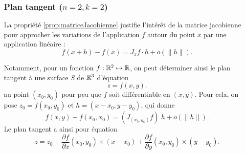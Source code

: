 
\subsubsection*{Plan tangent ($n = 2, k = 2$)}

La propriété \ref{prop:matriceJacobienne} justifie l'intérêt de la matrice jacobienne pour approcher les variations de l'application $f$ autour du point $x$ par une application linéaire : 
$$
f(x+h) - f(x) = J_xf \cdot h + o(\|h\|).
$$

Notamment, pour un fonction $f : \mathbb{R}^2 \mapsto \mathbb{R}$, on peut déterminer ainsi le plan tangent à une surface $S$ de $\mathbb{R}^3$ d'équation
$$
z = f(x, y).
$$
au point $(x_0, y_0)$ pour peu que $f$ soit différentiable en $(x, y)$. Pour cela, on pose $z_0 = f(x_0, y_0)$ et $h = (x-x_0, y-y_0)$, qui donne
$$
f(x, y) - f(x_0, x_0) = \left(J_{(x_0, y_0)} f\right) \; h + o(\|h\|).
$$
Le plan tangent a ainsi pour équation
$$
z = z_0 + \frac{\partial f}{\partial x}(x_0, y_0) \times (x-x_0) + \frac{\partial f}{\partial y}(x_0, y_0) \times (y-y_0).
$$

